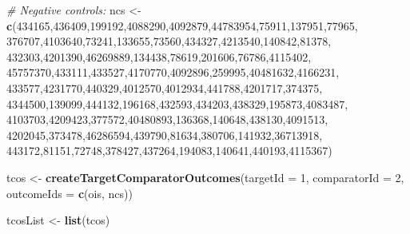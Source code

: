 \documentclass[11pt]{book}
\newenvironment{Shaded}{\begin{snugshade}}{\end{snugshade}}
\newcommand{\KeywordTok}[1]{\textcolor[rgb]{0.13,0.29,0.53}{\textbf{#1}}}
\newcommand{\DataTypeTok}[1]{\textcolor[rgb]{0.13,0.29,0.53}{#1}}
\newcommand{\DecValTok}[1]{\textcolor[rgb]{0.00,0.00,0.81}{#1}}
\newcommand{\StringTok}[1]{\textcolor[rgb]{0.31,0.60,0.02}{#1}}
\newcommand{\CommentTok}[1]{\textcolor[rgb]{0.56,0.35,0.01}{\textit{#1}}}
\newcommand{\NormalTok}[1]{#1}
\theoremstyle{definition}
\theoremstyle{definition}
\theoremstyle{definition}
\theoremstyle{remark}
\begin{document}
\begin{Shaded}
\begin{Highlighting}[]
\CommentTok{# Negative controls:}
\NormalTok{ncs <-}\StringTok{ }\KeywordTok{c}\NormalTok{(}\DecValTok{434165}\NormalTok{,}\DecValTok{436409}\NormalTok{,}\DecValTok{199192}\NormalTok{,}\DecValTok{4088290}\NormalTok{,}\DecValTok{4092879}\NormalTok{,}\DecValTok{44783954}\NormalTok{,}\DecValTok{75911}\NormalTok{,}\DecValTok{137951}\NormalTok{,}\DecValTok{77965}\NormalTok{,}
         \DecValTok{376707}\NormalTok{,}\DecValTok{4103640}\NormalTok{,}\DecValTok{73241}\NormalTok{,}\DecValTok{133655}\NormalTok{,}\DecValTok{73560}\NormalTok{,}\DecValTok{434327}\NormalTok{,}\DecValTok{4213540}\NormalTok{,}\DecValTok{140842}\NormalTok{,}\DecValTok{81378}\NormalTok{,}
         \DecValTok{432303}\NormalTok{,}\DecValTok{4201390}\NormalTok{,}\DecValTok{46269889}\NormalTok{,}\DecValTok{134438}\NormalTok{,}\DecValTok{78619}\NormalTok{,}\DecValTok{201606}\NormalTok{,}\DecValTok{76786}\NormalTok{,}\DecValTok{4115402}\NormalTok{,}
         \DecValTok{45757370}\NormalTok{,}\DecValTok{433111}\NormalTok{,}\DecValTok{433527}\NormalTok{,}\DecValTok{4170770}\NormalTok{,}\DecValTok{4092896}\NormalTok{,}\DecValTok{259995}\NormalTok{,}\DecValTok{40481632}\NormalTok{,}\DecValTok{4166231}\NormalTok{,}
         \DecValTok{433577}\NormalTok{,}\DecValTok{4231770}\NormalTok{,}\DecValTok{440329}\NormalTok{,}\DecValTok{4012570}\NormalTok{,}\DecValTok{4012934}\NormalTok{,}\DecValTok{441788}\NormalTok{,}\DecValTok{4201717}\NormalTok{,}\DecValTok{374375}\NormalTok{,}
         \DecValTok{4344500}\NormalTok{,}\DecValTok{139099}\NormalTok{,}\DecValTok{444132}\NormalTok{,}\DecValTok{196168}\NormalTok{,}\DecValTok{432593}\NormalTok{,}\DecValTok{434203}\NormalTok{,}\DecValTok{438329}\NormalTok{,}\DecValTok{195873}\NormalTok{,}\DecValTok{4083487}\NormalTok{,}
         \DecValTok{4103703}\NormalTok{,}\DecValTok{4209423}\NormalTok{,}\DecValTok{377572}\NormalTok{,}\DecValTok{40480893}\NormalTok{,}\DecValTok{136368}\NormalTok{,}\DecValTok{140648}\NormalTok{,}\DecValTok{438130}\NormalTok{,}\DecValTok{4091513}\NormalTok{,}
         \DecValTok{4202045}\NormalTok{,}\DecValTok{373478}\NormalTok{,}\DecValTok{46286594}\NormalTok{,}\DecValTok{439790}\NormalTok{,}\DecValTok{81634}\NormalTok{,}\DecValTok{380706}\NormalTok{,}\DecValTok{141932}\NormalTok{,}\DecValTok{36713918}\NormalTok{,}
         \DecValTok{443172}\NormalTok{,}\DecValTok{81151}\NormalTok{,}\DecValTok{72748}\NormalTok{,}\DecValTok{378427}\NormalTok{,}\DecValTok{437264}\NormalTok{,}\DecValTok{194083}\NormalTok{,}\DecValTok{140641}\NormalTok{,}\DecValTok{440193}\NormalTok{,}\DecValTok{4115367}\NormalTok{)}

\NormalTok{tcos <-}\StringTok{ }\KeywordTok{createTargetComparatorOutcomes}\NormalTok{(}\DataTypeTok{targetId =} \DecValTok{1}\NormalTok{,}
                                       \DataTypeTok{comparatorId =} \DecValTok{2}\NormalTok{,}
                                       \DataTypeTok{outcomeIds =} \KeywordTok{c}\NormalTok{(ois, ncs))}

\NormalTok{tcosList <-}\StringTok{ }\KeywordTok{list}\NormalTok{(tcos)}
\end{Highlighting}
\end{Shaded}
\end{document}
